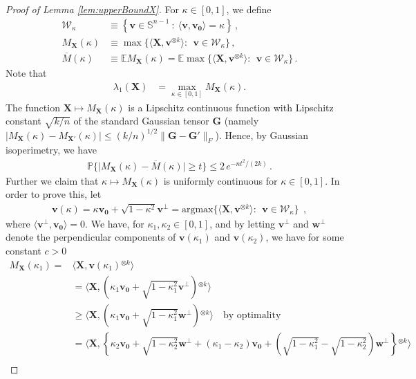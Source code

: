 \documentclass[11pt]{article}
\theoremstyle{definition}
\def\oM{\overline{M}}
\def\<{\langle}
\def\>{\rangle}
\def\prob{{\mathbb P}}
\def\E{{\mathbb E}} %
\def\bv{\mathbf{v}}
\def\bw{\mathbf{w}}
\def\bvz{\mathbf{v_0}}
\def\bX{\mathbf{X}}
\def\bG{\mathbf{G}}
\def\cW{\mathcal{W}}
\def\bbS{\mathbb{S}}
\def\E{\mathbb{E}}
\def\ok{{^{\otimes k}}}
\begin{document}
\begin{proof}[Proof of Lemma \ref{lem:upperBoundX}]
For $\kappa\in [0,1]$, we define
%
\begin{align}
%
\cW_{\kappa} &\equiv \left \{ \bv \in \bbS^{n-1}~:~ 
  \<\bv,\bvz\> =\kappa\right \}\,, \\
M_{\bX}(\kappa) & \equiv\max\big\{\<\bX, \bv^{\otimes k}\>:\;\, 
\bv\in\cW_{\kappa}\big\}\, ,\\
\oM(\kappa) & \equiv\E M_{\bX}(\kappa) = \E \max\big\{\<\bX,\bv^{\otimes k}\>:\;\, 
\bv\in\cW_{\kappa}\big\}\, .
%
\end{align}
%
Note that 
%
\begin{align}
%
\lambda_1(\bX) & = \max_{\kappa\in [0,1]}M_{\bX}(\kappa) . \label{eq:SigmaPlus}
%
\end{align}
%
The function  $\bX\mapsto M_{\bX}(\kappa)$ is a Lipschitz continuous
function with
Lipschitz constant  $\sqrt{k/n}$ of the standard 
Gaussian tensor  $\bG$ (namely $|M_{\bX}(\kappa)-M_{\bX'}(\kappa)|\le
(k/n)^{1/2}\|\bG-\bG'\|_F$). Hence, by Gaussian isoperimetry, we have 
%
\begin{align}
%
\prob \Big\{ \big|M_{\bX}(\kappa) - \oM(\kappa)\big| \ge t \Big\}
  \le 2\, 
  e^{-n t^2/(2k)}\, . \label{eq:Isoperimetry}
%
\end{align}
%
Further we claim that $\kappa\mapsto M_{\bX}(\kappa)$ is uniformly
continuous for $\kappa\in [0,1]$. In order to prove this, let 
%
\begin{align}
%
\bv(\kappa) = \kappa \bvz + \sqrt{1-\kappa^2} \bv^\perp = \text{argmax} \big\{\<\bX, \bv^{\otimes k}\>:\;\, 
\bv\in\cW_{\kappa}\big\}~~,
%
\end{align}
%
where $\<\bv^\perp,\bvz\> = 0 $. We have, for $\kappa_1,\kappa_2 \in
[0,1]$, and by letting 
$\bv^\perp$ and $\bw^\perp$ denote the  perpendicular components
of $\bv(\kappa_1)$ and $\bv(\kappa_2)$, we have for some constant $c>0$
%
\begin{align}
%
M_\bX(\kappa_1) = & \< \bX , \bv(\kappa_1)\ok \> \nonumber \\
& = \< \bX ,\left (\kappa_1 \bvz + \sqrt{1-\kappa_1^2} \bv^\perp\right )\ok \> \nonumber\\
& \geq   \< \bX ,\left (\kappa_1 \bvz + \sqrt{1-\kappa_1^2} \bw^\perp\right )\ok \>  \quad\text{by optimality} \nonumber\\
& = \< \bX , \left \{ \kappa_2 \bvz + \sqrt{1-\kappa_2^2} \bw^\perp + (\kappa_1 - \kappa_2) \bvz + \left ( \sqrt{1-\kappa_1^2} - \sqrt{1-\kappa_2^2} \right )\bw^\perp \right \}\ok \> \nonumber\\

\end{align}
\end{proof}
\end{document}
